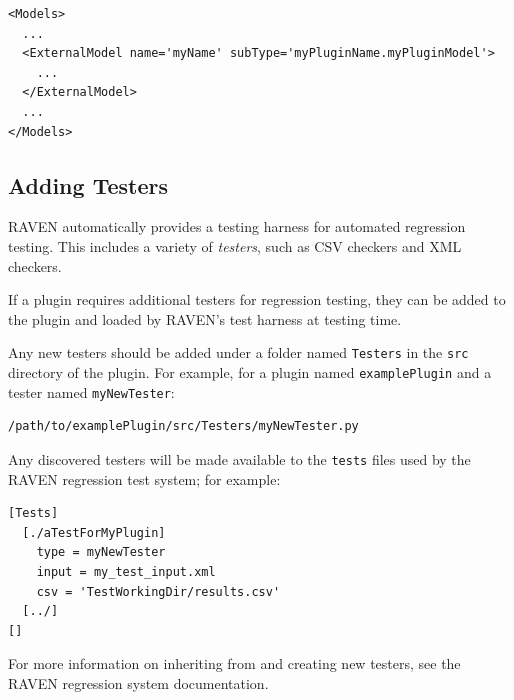 \begin{lstlisting}[style=XML, morekeywords={usingPlugin}]
<Models>
  ...
  <ExternalModel name='myName' subType='myPluginName.myPluginModel'>
    ...
  </ExternalModel>
  ...
</Models>
\end{lstlisting}

\subsection{Adding Testers}
RAVEN automatically provides a testing harness for automated regression testing. This includes a
variety of \emph{testers}, such as CSV checkers and XML checkers.

If a plugin requires additional testers for regression testing, they can be added to the plugin and
loaded by RAVEN's test harness at testing time.

Any new testers should be added under a folder named \texttt{Testers} in the \texttt{src} directory
of the plugin. For example, for a plugin named \texttt{examplePlugin} and a tester named
\texttt{myNewTester}:
\begin{lstlisting}[morekeywords={examplePlugin,myNewTester}]
  /path/to/examplePlugin/src/Testers/myNewTester.py
\end{lstlisting}
Any discovered testers will be made available to the \texttt{tests} files used by the RAVEN
regression test system; for example:
\begin{lstlisting}[morekeywords={myNewTester}]
[Tests]
  [./aTestForMyPlugin]
    type = myNewTester
    input = my_test_input.xml
    csv = 'TestWorkingDir/results.csv'
  [../]
[]
\end{lstlisting}

For more information on inheriting from and creating new testers, see the RAVEN regression system
documentation.

